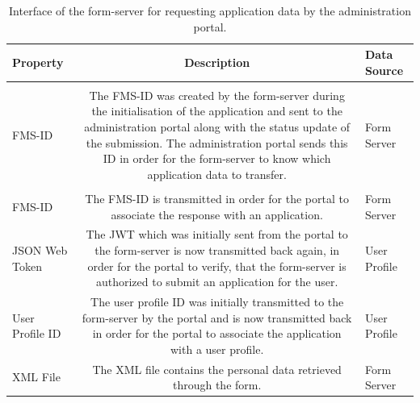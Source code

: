 \documentclass[
     12pt,         %
     a4paper,      %
     BCOR=10mm,version=first,     %
     DIV=14,version=first,        %
     ]{scrreprt}
\begin{document}
        \begin{table}[!h]
            \begin{tabularx}{\textwidth}{|l|C|l|}
            \hline
            Property & Description & Data Source \\
            \hline
             \\
            \hline
            
            FMS-ID & The FMS-ID was created by the form-server during the initialisation of the application and sent to the administration portal along with the status update of the submission. The administration portal sends this ID in order for the form-server to know which application data to transfer. & Form Server \\
            
            \hline
             \\
            \hline
            
            FMS-ID & The FMS-ID is transmitted in order for the portal to associate the response with an application. & Form Server \\
            
            \hline
            
            JSON Web Token & The JWT which was initially sent from the portal to the form-server is now transmitted back again, in order for the portal to verify, that the form-server is authorized to submit an application for the user. & User Profile \\
            
            \hline
            
            User Profile ID & The user profile ID was initially transmitted to the form-server by the portal and is now transmitted back in order for the portal to associate the application with a user profile. & User Profile \\
            
            \hline
            
            XML File & The XML file contains the personal data retrieved through the form. & Form Server \\
            
            \hline
            \end{tabularx}
            \caption{Interface of the form-server for requesting application data by the administration portal.}
            \label{table:interface_application_data}
        \end{table}

\printbibliography
\end{document}
